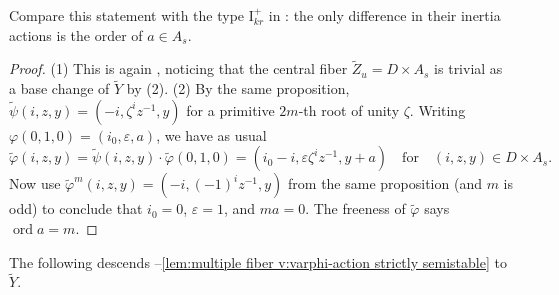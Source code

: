 \documentclass[reqno, letterpaper]{amsart}
\numberwithin{equation}{subsection}
\DeclareMathOperator{\ord}{ord}
\begin{document}
		Compare this statement with the type $\mathrm I^+_{kr}$ in : the only difference in their inertia actions is the order of $a \in A_s$.
		
		\begin{proof}
			(1) This is again , noticing that the central fiber $\tilde Z_u = D \times A_s$ is trivial as a base change of $\tilde Y$ by (2). (2) By the same proposition, $\tilde \psi(i,z,y) = (-i, \zeta^i z^{-1}, y)$ for a primitive $2m$-th root of unity $\zeta$. Writing $\varphi (0,1,0) = (i_0, \varepsilon, a)$, we have as usual
			\[ \tilde \varphi(i,z,y) = \tilde \psi(i,z,y) \cdot \tilde \varphi (0,1,0) = (i_0 - i, \varepsilon \zeta^i z^{-1}, y + a) \quad\mbox{for}\quad (i,z,y) \in D \times A_s .\]
			Now use $\tilde \varphi^m (i,z,y) = (-i, (-1)^i z^{-1}, y)$ from the same proposition (and $m$ is odd) to conclude that $i_0 = 0$, $\varepsilon = 1$, and $ma = 0$. The freeness of $\tilde \varphi$ says $\ord a = m$.
		\end{proof}
		
		The following descends --\ref{lem:multiple fiber v:varphi-action strictly semistable} to $\tilde Y$.
		
\end{document}
